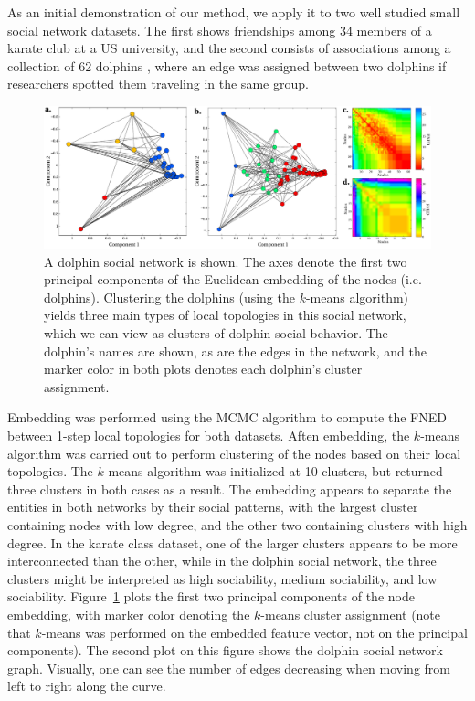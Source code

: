 \documentclass{article}
\begin{document}
As an initial demonstration of our method, we apply it to two well studied small social network datasets. The first shows friendships among 34 members of a karate club at a US university, and the second consists of associations among a collection of 62 dolphins \cite{bottleNoseDolphinPeople}, where an edge was assigned between two dolphins if researchers spotted them traveling in the same group.
\begin{figure}[h!tbp]
  \centering               
  \includegraphics[width=1\textwidth]{fig/fig3.pdf}
  \caption{A dolphin social network is shown. The axes denote the first two principal components of the Euclidean embedding of the nodes (i.e. dolphins). Clustering the dolphins (using the $k$-means algorithm) yields three main types of local topologies in this social network, which we can view as clusters of dolphin social behavior. The dolphin's names are shown, as are the edges in the network, and the marker color in both plots denotes each dolphin's cluster assignment.}
  \label{fig:dolphinSocialNetwork}
\end{figure}

Embedding was performed using the MCMC algorithm to compute the FNED between 1-step local topologies for both datasets. Aften embedding, the $k$-means algorithm was carried out to perform clustering of the nodes based on their local topologies. The $k$-means algorithm was initialized at 10 clusters, but returned three clusters in both cases as a result. The embedding appears to separate the entities in both networks by their social patterns, with the largest cluster containing nodes with low degree, and the other two containing clusters with high degree. In the karate class dataset, one of the larger clusters appears to be more interconnected than the other, while in the dolphin social network, the three clusters might be interpreted as high sociability, medium sociability, and low sociability. Figure~\ref{fig:dolphinSocialNetwork} plots the first two principal components of the node embedding, with marker color denoting the $k$-means cluster assignment (note that $k$-means was performed on the embedded feature vector, not on the principal components). The second plot on this figure shows the dolphin social network graph. Visually, one can see the number of edges decreasing when moving from left to right along the curve.
\end{document}
